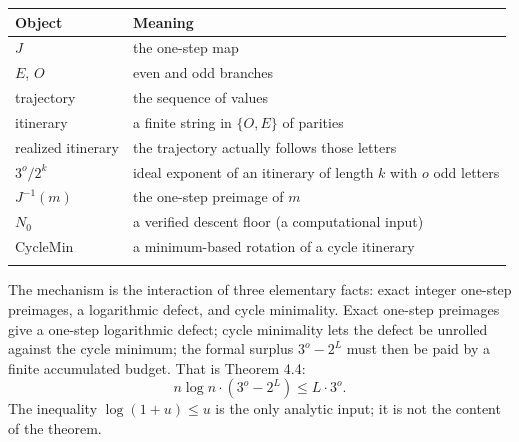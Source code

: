 \documentclass[12pt]{article}
\begin{document}
\begin{longtable}[]{@{}
  >{\raggedright\arraybackslash}p{}
  >{\raggedright\arraybackslash}p{}@{}}
\toprule\noalign{}
\begin{minipage}[b]{\linewidth}\raggedright
Object
\end{minipage} & \begin{minipage}[b]{\linewidth}\raggedright
Meaning
\end{minipage} \\
\midrule\noalign{}
\endhead
\bottomrule\noalign{}
\endfoot
\bottomrule\noalign{}
\endlastfoot
\(J\) & the one-step map \\
\(E\), \(O\) & even and odd branches \\
trajectory & the sequence of values \\
itinerary & a finite string in \(\{O,E\}\) of parities \\
realized itinerary & the trajectory actually follows those letters \\
\(3^o/2^k\) & ideal exponent of an itinerary of length \(k\) with \(o\)
odd letters \\
\(J^{-1}(m)\) & the one-step preimage of \(m\) \\
\(N_0\) & a verified descent floor (a computational input) \\
CycleMin & a minimum-based rotation of a cycle itinerary \\*
\end{longtable}

\endgroup

The mechanism is the interaction of three elementary facts: exact
integer one-step preimages, a logarithmic defect, and cycle minimality.
Exact one-step preimages give a one-step logarithmic defect; cycle
minimality lets the defect be unrolled against the cycle minimum; the
formal surplus \(3^o-2^L\) must then be paid by a finite accumulated
budget. That is Theorem 4.4: \[
n\log n\cdot(3^o-2^L)\le L\cdot 3^o.
\] The inequality \(\log(1+u)\le u\) is the only analytic input; it is
not the content of the theorem.
\end{document}
